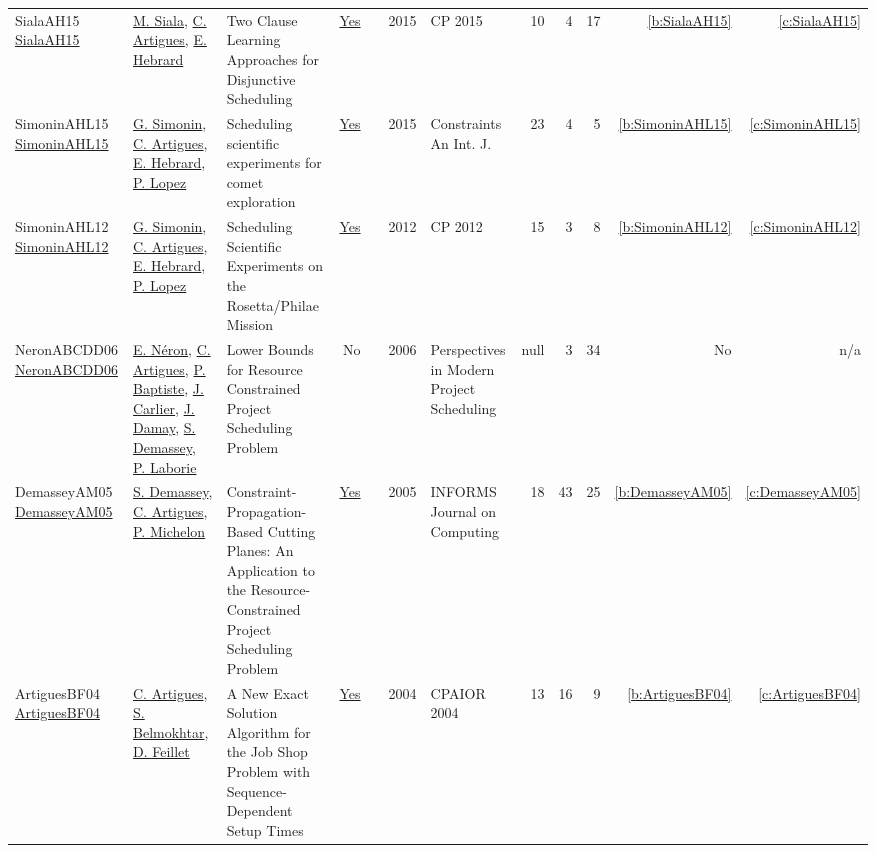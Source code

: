 {\begin{longtable}{>{\raggedright\arraybackslash}p{3cm}>{\raggedright\arraybackslash}p{6cm}>{\raggedright\arraybackslash}p{6.5cm}rrrp{2.5cm}rrrrr}
SialaAH15 \href{https://doi.org/10.1007/978-3-319-23219-5\_28}{SialaAH15} & \hyperref[auth:a130]{M. Siala}, \hyperref[auth:a6]{C. Artigues}, \hyperref[auth:a1]{E. Hebrard} & Two Clause Learning Approaches for Disjunctive Scheduling & \href{../works/SialaAH15.pdf}{Yes} & \cite{SialaAH15} & 2015 & CP 2015 & 10 & 4 & 17 & \ref{b:SialaAH15} & \ref{c:SialaAH15}\\
SimoninAHL15 \href{https://doi.org/10.1007/s10601-014-9169-3}{SimoninAHL15} & \hyperref[auth:a127]{G. Simonin}, \hyperref[auth:a6]{C. Artigues}, \hyperref[auth:a1]{E. Hebrard}, \hyperref[auth:a3]{P. Lopez} & Scheduling scientific experiments for comet exploration & \href{../works/SimoninAHL15.pdf}{Yes} & \cite{SimoninAHL15} & 2015 & Constraints An Int. J. & 23 & 4 & 5 & \ref{b:SimoninAHL15} & \ref{c:SimoninAHL15}\\
SimoninAHL12 \href{https://doi.org/10.1007/978-3-642-33558-7\_5}{SimoninAHL12} & \hyperref[auth:a127]{G. Simonin}, \hyperref[auth:a6]{C. Artigues}, \hyperref[auth:a1]{E. Hebrard}, \hyperref[auth:a3]{P. Lopez} & Scheduling Scientific Experiments on the Rosetta/Philae Mission & \href{../works/SimoninAHL12.pdf}{Yes} & \cite{SimoninAHL12} & 2012 & CP 2012 & 15 & 3 & 8 & \ref{b:SimoninAHL12} & \ref{c:SimoninAHL12}\\
NeronABCDD06 \href{http://dx.doi.org/10.1007/978-0-387-33768-5_7}{NeronABCDD06} & \hyperref[auth:a917]{E. Néron}, \hyperref[auth:a6]{C. Artigues}, \hyperref[auth:a164]{P. Baptiste}, \hyperref[auth:a858]{J. Carlier}, \hyperref[auth:a918]{J. Damay}, \hyperref[auth:a246]{S. Demassey}, \hyperref[auth:a118]{P. Laborie} & Lower Bounds for Resource Constrained Project Scheduling Problem & No & \cite{NeronABCDD06} & 2006 & Perspectives in Modern Project Scheduling & null & 3 & 34 & No & n/a\\
DemasseyAM05 \href{http://dx.doi.org/10.1287/ijoc.1030.0043}{DemasseyAM05} & \hyperref[auth:a246]{S. Demassey}, \hyperref[auth:a6]{C. Artigues}, \hyperref[auth:a361]{P. Michelon} & Constraint-Propagation-Based Cutting Planes: An Application to the Resource-Constrained Project Scheduling Problem & \href{../works/DemasseyAM05.pdf}{Yes} & \cite{DemasseyAM05} & 2005 & INFORMS Journal on Computing & 18 & 43 & 25 & \ref{b:DemasseyAM05} & \ref{c:DemasseyAM05}\\
ArtiguesBF04 \href{https://doi.org/10.1007/978-3-540-24664-0\_3}{ArtiguesBF04} & \hyperref[auth:a6]{C. Artigues}, \hyperref[auth:a389]{S. Belmokhtar}, \hyperref[auth:a362]{D. Feillet} & A New Exact Solution Algorithm for the Job Shop Problem with Sequence-Dependent Setup Times & \href{../works/ArtiguesBF04.pdf}{Yes} & \cite{ArtiguesBF04} & 2004 & CPAIOR 2004 & 13 & 16 & 9 & \ref{b:ArtiguesBF04} & \ref{c:ArtiguesBF04}\\

\end{longtable}}
